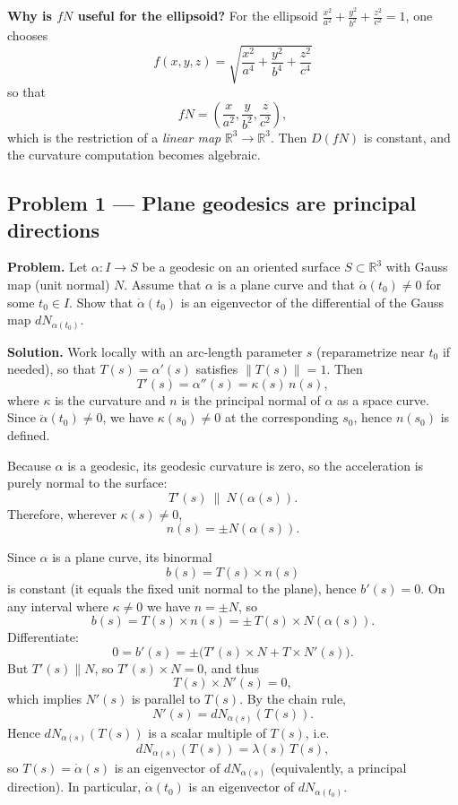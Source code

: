 \documentclass[12pt,a4paper]{article}
\theoremstyle{plain}
\theoremstyle{definition}      %
\begin{document}
	\medskip
	\textbf{Why is $fN$ useful for the ellipsoid?}
	For the ellipsoid $\frac{x^2}{a^2}+\frac{y^2}{b^2}+\frac{z^2}{c^2}=1$, one chooses
	\[
	f(x,y,z)=\sqrt{\frac{x^2}{a^4}+\frac{y^2}{b^4}+\frac{z^2}{c^4}}
	\]
	so that
	\[
	fN=\left(\frac{x}{a^2},\frac{y}{b^2},\frac{z}{c^2}\right),
	\]
	which is the restriction of a \emph{linear map} $\mathbb R^3\to\mathbb R^3$.
	Then $D(fN)$ is constant, and the curvature computation becomes algebraic.
	
	\subsection*{Problem 1 — Plane geodesics are principal directions}
	
	\textbf{Problem.}
	Let $\alpha:I\to S$ be a geodesic on an oriented surface $S\subset\mathbb R^3$ with Gauss map (unit normal) $N$.
	Assume that $\alpha$ is a plane curve and that $\ddot\alpha(t_0)\neq 0$ for some $t_0\in I$.
	Show that $\dot\alpha(t_0)$ is an eigenvector of the differential of the Gauss map $dN_{\alpha(t_0)}$.
	
	\medskip
	\textbf{Solution.}
	Work locally with an arc-length parameter $s$ (reparametrize near $t_0$ if needed), so that
	$T(s)=\alpha'(s)$ satisfies $\|T(s)\|=1$.
	Then
	\[
	T'(s)=\alpha''(s)=\kappa(s)\,n(s),
	\]
	where $\kappa$ is the curvature and $n$ is the principal normal of $\alpha$ as a space curve.
	Since $\ddot\alpha(t_0)\neq 0$, we have $\kappa(s_0)\neq 0$ at the corresponding $s_0$, hence $n(s_0)$ is defined.
	
	Because $\alpha$ is a geodesic, its geodesic curvature is zero, so the acceleration is purely normal to the surface:
	\[
	T'(s)\ \parallel\ N(\alpha(s)).
	\]
	Therefore, wherever $\kappa(s)\neq 0$,
	\[
	n(s)=\pm N(\alpha(s)).
	\]
	
	Since $\alpha$ is a plane curve, its binormal
	\[
	b(s)=T(s)\times n(s)
	\]
	is constant (it equals the fixed unit normal to the plane), hence $b'(s)=0$.
	On any interval where $\kappa\neq 0$ we have $n=\pm N$, so
	\[
	b(s)=T(s)\times n(s)=\pm\,T(s)\times N(\alpha(s)).
	\]
	Differentiate:
	\[
	0=b'(s)=\pm\big(T'(s)\times N + T\times N'(s)\big).
	\]
	But $T'(s)\parallel N$, so $T'(s)\times N=0$, and thus
	\[
	T(s)\times N'(s)=0,
	\]
	which implies $N'(s)$ is parallel to $T(s)$.
	By the chain rule,
	\[
	N'(s)=dN_{\alpha(s)}(T(s)).
	\]
	Hence $dN_{\alpha(s)}(T(s))$ is a scalar multiple of $T(s)$, i.e.
	\[
	dN_{\alpha(s)}(T(s))=\lambda(s)\,T(s),
	\]
	so $T(s)=\dot\alpha(s)$ is an eigenvector of $dN_{\alpha(s)}$ (equivalently, a principal direction).
	In particular, $\dot\alpha(t_0)$ is an eigenvector of $dN_{\alpha(t_0)}$.
	
\end{document}
